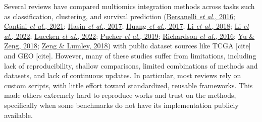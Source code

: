 \documentclass[
]{article}
\begin{document}
Several reviews have compared multiomics integration methods across tasks such as classification, clustering, and survival prediction (\protect\hyperlink{ref-bersanelli2016methods}{Bersanelli \emph{et al.}, 2016}; \protect\hyperlink{ref-cantini2021benchmarking}{Cantini \emph{et al.}, 2021}; \protect\hyperlink{ref-hasin2017multi}{Hasin \emph{et al.}, 2017}; \protect\hyperlink{ref-huang2017more}{Huang \emph{et al.}, 2017}; \protect\hyperlink{ref-li2018review}{Li \emph{et al.}, 2018}; \protect\hyperlink{ref-li2022benchmark}{Li \emph{et al.}, 2022}; \protect\hyperlink{ref-luecken2022benchmarking}{Luecken \emph{et al.}, 2022}; \protect\hyperlink{ref-pucher2019comparison}{Pucher \emph{et al.}, 2019}; \protect\hyperlink{ref-richardson2016statistical}{Richardson \emph{et al.}, 2016}; \protect\hyperlink{ref-yu2018integrative}{Yu \& Zeng, 2018}; \protect\hyperlink{ref-zeng2018review}{Zeng \& Lumley, 2018}) with public dataset sources like TCGA {[}cite{]} and GEO {[}cite{]}. However, many of these studies suffer from limitations, including lack of reproducibility, shallow comparisons, limited combinations of methods and datasets, and lack of continuous updates. In particular, most reviews rely on custom scripts, with little effort toward standardized, reusable frameworks. This made others extremely hard to reproduce works and trust on the methods, specifically when some benchmarks do not have its implementation publicly available.
\end{document}
